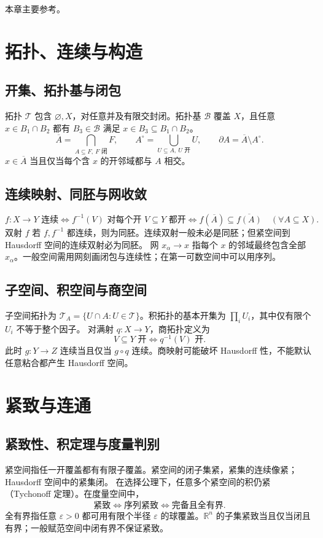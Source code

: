 \documentclass[../main.tex]{subfiles}
\begin{document}
本章主要参考\cite{topology}。

\section{拓扑、连续与构造}
\subsection{开集、拓扑基与闭包}
拓扑 $\mathcal T$ 包含 $\varnothing,X$，对任意并及有限交封闭。拓扑基 $\mathcal B$ 覆盖 $X$，且任意 $x\in B_1\cap B_2$ 都有 $B_3\in\mathcal B$ 满足 $x\in B_3\subseteq B_1\cap B_2$。
\[
\overline A=\bigcap_{A\subseteq F,\ F\text{ 闭}}F,\qquad
A^\circ=\bigcup_{U\subseteq A,\ U\text{ 开}}U,\qquad
\partial A=\overline A\setminus A^\circ.
\]
$x\in\overline A$ 当且仅当每个含 $x$ 的开邻域都与 $A$ 相交。
\subsection{连续映射、同胚与网收敛}
\[
f:X\to Y\text{ 连续}\iff f^{-1}(V)\text{ 对每个开 }V\subseteq Y\text{ 都开}
\iff f(\overline A)\subseteq\overline{f(A)}\quad(\forall A\subseteq X).
\]
双射 $f$ 若 $f,f^{-1}$ 都连续，则为同胚。连续双射一般未必是同胚；但紧空间到 Hausdorff 空间的连续双射必为同胚。
网 $x_\alpha\to x$ 指每个 $x$ 的邻域最终包含全部 $x_\alpha$。一般空间需用网刻画闭包与连续性；在第一可数空间中可以用序列。
\subsection{子空间、积空间与商空间}
子空间拓扑为 $\mathcal T_A=\{U\cap A:U\in\mathcal T\}$。积拓扑的基本开集为 $\prod_iU_i$，其中仅有限个 $U_i$ 不等于整个因子。
对满射 $q:X\to Y$，商拓扑定义为
\[
V\subseteq Y\text{ 开}\iff q^{-1}(V)\text{ 开}.
\]
此时 $g:Y\to Z$ 连续当且仅当 $g\circ q$ 连续。商映射可能破坏 Hausdorff 性，不能默认任意粘合都产生 Hausdorff 空间。
\section{紧致与连通}
\subsection{紧致性、积定理与度量判别}
紧空间指任一开覆盖都有有限子覆盖。紧空间的闭子集紧，紧集的连续像紧；Hausdorff 空间中的紧集闭。
在选择公理下，任意多个紧空间的积仍紧（Tychonoff 定理）。在度量空间中，
\[
\text{紧致}\iff\text{序列紧致}\iff\text{完备且全有界}.
\]
全有界指任意 $\varepsilon>0$ 都可用有限个半径 $\varepsilon$ 的球覆盖。$\mathbb R^n$ 的子集紧致当且仅当闭且有界；一般赋范空间中闭有界不保证紧致。
\end{document}
